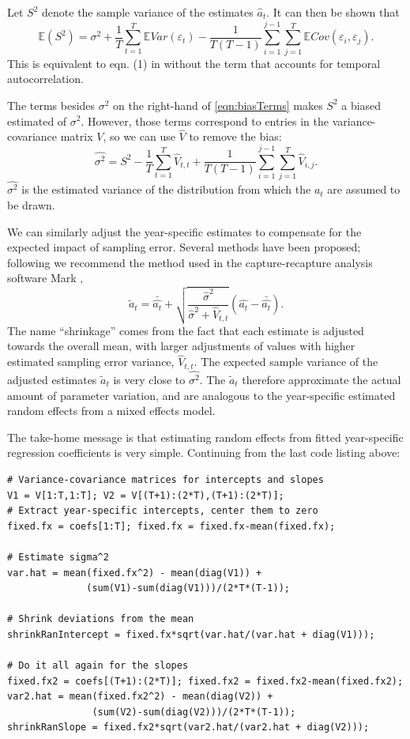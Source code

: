 \documentclass[12pt]{article}
\newcommand{\be}{\begin{equation}}
\newcommand{\ee}{\end{equation}}
\begin{document}
Let $S^2$ denote the sample variance of the estimates $\hat{a}_t$. It can then be shown that 
\be
\mathbb{E}(S^2) = \sigma^2  + \frac{1}{T}\sum\limits_{t=1}^T \mathbb{E} Var(\varepsilon_t) 
- \frac{1}{T(T-1)}\sum\limits_{i=1}^{j-1} \sum\limits_{j=1}^T \mathbb{E}Cov(\varepsilon_i, \varepsilon_j). 
\label{eqn:biasTerms}
\ee
This is equivalent to eqn. (1) in \citet{gould-nichols-1998} without the term that 
accounts for temporal autocorrelation. 

The terms besides $\sigma^2$ on the right-hand of \eqref{eqn:biasTerms} makes $S^2$ a biased estimated of $\sigma^2$. 
However, those terms correspond to entries in the variance-covariance matrix $V$, so we can use $\hat{V}$ to remove 
the bias: 
\be
\hat{\sigma^2}  = S^2 - \frac{1}{T}\sum\limits_{t=1}^T \hat{V}_{t,t} + 
\frac{1}{T(T-1)}\sum\limits_{i=1}^{j-1} \sum\limits_{j=1}^T \hat{V}_{i,j}. 
\label{eqn:hatSigma}
\ee
$\hat{\sigma^2}$ is the estimated variance of the distribution from which the $a_t$ are assumed
to be drawn. 

We can similarly adjust the year-specific estimates to compensate for the expected impact of sampling error. Several methods  
have been proposed; following \citet{metcalf-etal-2015} we recommend the method used in the 
capture-recapture analysis software Mark \citet{cooch-white-2020}, 
\be
\widetilde{a}_t = \bar{\hat{a_t}} + \sqrt{\frac{\hat{\sigma}^2}{\hat{\sigma}^2 + \hat{V}_{t,t}}}\left (\hat{a_t} - \bar{\hat{a_t}} \right). 
\label{eqn:ShrinkLess}
\ee
The name ``shrinkage'' comes from the fact that each estimate is adjusted towards the overall mean, with 
larger adjustments of values with higher estimated sampling error variance, $\hat{V}_{t,t}$. 
The expected sample variance of the adjusted estimates $\widetilde{a}_t$ is very close to $\hat{\sigma^2}$. 
The $\widetilde{a}_t$ therefore approximate the actual amount of parameter variation, and are analogous to the 
year-specific estimated random effects from a mixed effects model. 

The take-home message is that estimating random effects from fitted year-specific regression 
coefficients is very simple. Continuing from the last code listing above: 
\begin{lstlisting}
# Variance-covariance matrices for intercepts and slopes
V1 = V[1:T,1:T]; V2 = V[(T+1):(2*T),(T+1):(2*T)]; 
# Extract year-specific intercepts, center them to zero   
fixed.fx = coefs[1:T]; fixed.fx = fixed.fx-mean(fixed.fx); 

# Estimate sigma^2
var.hat = mean(fixed.fx^2) - mean(diag(V1)) + 
              (sum(V1)-sum(diag(V1)))/(2*T*(T-1)); 

# Shrink deviations from the mean 
shrinkRanIntercept = fixed.fx*sqrt(var.hat/(var.hat + diag(V1)));

# Do it all again for the slopes 
fixed.fx2 = coefs[(T+1):(2*T)]; fixed.fx2 = fixed.fx2-mean(fixed.fx2); 
var2.hat = mean(fixed.fx2^2) - mean(diag(V2)) + 
               (sum(V2)-sum(diag(V2)))/(2*T*(T-1)); 
shrinkRanSlope = fixed.fx2*sqrt(var2.hat/(var2.hat + diag(V2))); 
\end{lstlisting}
\end{document}
